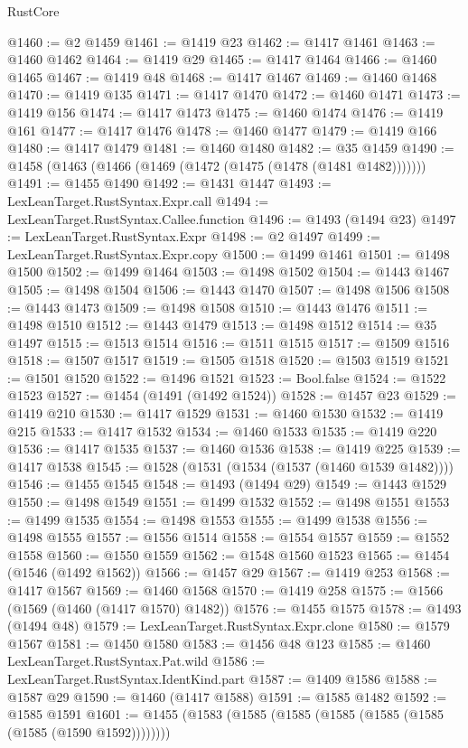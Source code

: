 \begin{lexlean}{RustCore}
\begin{coremodule}
@1460 := @2 @1459
@1461 := @1419 @23
@1462 := @1417 @1461
@1463 := @1460 @1462
@1464 := @1419 @29
@1465 := @1417 @1464
@1466 := @1460 @1465
@1467 := @1419 @48
@1468 := @1417 @1467
@1469 := @1460 @1468
@1470 := @1419 @135
@1471 := @1417 @1470
@1472 := @1460 @1471
@1473 := @1419 @156
@1474 := @1417 @1473
@1475 := @1460 @1474
@1476 := @1419 @161
@1477 := @1417 @1476
@1478 := @1460 @1477
@1479 := @1419 @166
@1480 := @1417 @1479
@1481 := @1460 @1480
@1482 := @35 @1459
@1490 := @1458 (@1463 (@1466 (@1469 (@1472 (@1475 (@1478 (@1481 @1482)))))))
@1491 := @1455 @1490
@1492 := @1431 @1447
@1493 := LexLeanTarget.RustSyntax.Expr.call
@1494 := LexLeanTarget.RustSyntax.Callee.function
@1496 := @1493 (@1494 @23)
@1497 := LexLeanTarget.RustSyntax.Expr
@1498 := @2 @1497
@1499 := LexLeanTarget.RustSyntax.Expr.copy
@1500 := @1499 @1461
@1501 := @1498 @1500
@1502 := @1499 @1464
@1503 := @1498 @1502
@1504 := @1443 @1467
@1505 := @1498 @1504
@1506 := @1443 @1470
@1507 := @1498 @1506
@1508 := @1443 @1473
@1509 := @1498 @1508
@1510 := @1443 @1476
@1511 := @1498 @1510
@1512 := @1443 @1479
@1513 := @1498 @1512
@1514 := @35 @1497
@1515 := @1513 @1514
@1516 := @1511 @1515
@1517 := @1509 @1516
@1518 := @1507 @1517
@1519 := @1505 @1518
@1520 := @1503 @1519
@1521 := @1501 @1520
@1522 := @1496 @1521
@1523 := Bool.false
@1524 := @1522 @1523
@1527 := @1454 (@1491 (@1492 @1524))
@1528 := @1457 @23
@1529 := @1419 @210
@1530 := @1417 @1529
@1531 := @1460 @1530
@1532 := @1419 @215
@1533 := @1417 @1532
@1534 := @1460 @1533
@1535 := @1419 @220
@1536 := @1417 @1535
@1537 := @1460 @1536
@1538 := @1419 @225
@1539 := @1417 @1538
@1545 := @1528 (@1531 (@1534 (@1537 (@1460 @1539 @1482))))
@1546 := @1455 @1545
@1548 := @1493 (@1494 @29)
@1549 := @1443 @1529
@1550 := @1498 @1549
@1551 := @1499 @1532
@1552 := @1498 @1551
@1553 := @1499 @1535
@1554 := @1498 @1553
@1555 := @1499 @1538
@1556 := @1498 @1555
@1557 := @1556 @1514
@1558 := @1554 @1557
@1559 := @1552 @1558
@1560 := @1550 @1559
@1562 := @1548 @1560 @1523
@1565 := @1454 (@1546 (@1492 @1562))
@1566 := @1457 @29
@1567 := @1419 @253
@1568 := @1417 @1567
@1569 := @1460 @1568
@1570 := @1419 @258
@1575 := @1566 (@1569 (@1460 (@1417 @1570) @1482))
@1576 := @1455 @1575
@1578 := @1493 (@1494 @48)
@1579 := LexLeanTarget.RustSyntax.Expr.clone
@1580 := @1579 @1567
@1581 := @1450 @1580
@1583 := @1456 @48 @123
@1585 := @1460 LexLeanTarget.RustSyntax.Pat.wild
@1586 := LexLeanTarget.RustSyntax.IdentKind.part
@1587 := @1409 @1586
@1588 := @1587 @29
@1590 := @1460 (@1417 @1588)
@1591 := @1585 @1482
@1592 := @1585 @1591
@1601 := @1455 (@1583 (@1585 (@1585 (@1585 (@1585 (@1585 (@1585 (@1590 @1592))))))))

\end{coremodule}
\end{lexlean}
